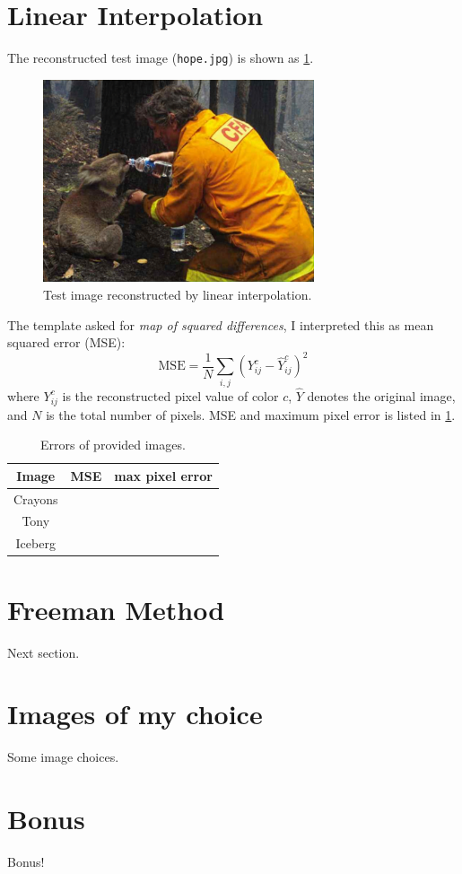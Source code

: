 \documentclass[12pt]{article}
\begin{document}
\section{Linear Interpolation}
	The reconstructed test image (\lstinline{hope.jpg}) is shown as \cref{fig:hope-recon-linear}.
	\begin{figure}[h]
		\centering
		\caption{Test image reconstructed by linear interpolation.}
		\label{fig:hope-recon-linear}
		\includegraphics[width=8cm]{hope_recon_lin.png}
	\end{figure}

	The template asked for \textit{map of squared differences}, I interpreted this as mean squared error (MSE):
	\begin{equation*}
		\text{MSE} = \frac{1}{N} \sum_{i,j} (Y_{ij}^c - \hat{Y}_{ij}^c)^2
	\end{equation*}
	where $Y_{ij}^c$ is the reconstructed pixel value of color $c$, $\hat{Y}$ denotes the original image, and $N$ is the total number of pixels.
	MSE and maximum pixel error is listed in \cref{tab:errors-linear}.

	\begin{table}[h]
		\centering
		\caption{Errors of provided images.}
		\label{tab:errors-linear}
		\begin{tabular}{c|cc}
			\toprule
			Image & MSE & max pixel error \\
			\midrule
			Crayons & & \\
			Tony & & \\
			Iceberg & & \\
			\bottomrule
		\end{tabular}
	\end{table}

\section{Freeman Method}
	Next section.

\section{Images of my choice}
	Some image choices.

\section{Bonus}
	Bonus!
\end{document}
